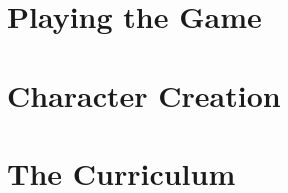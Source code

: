 

\part{Playing the Game}





\part{Character Creation}









\part{The Curriculum}













